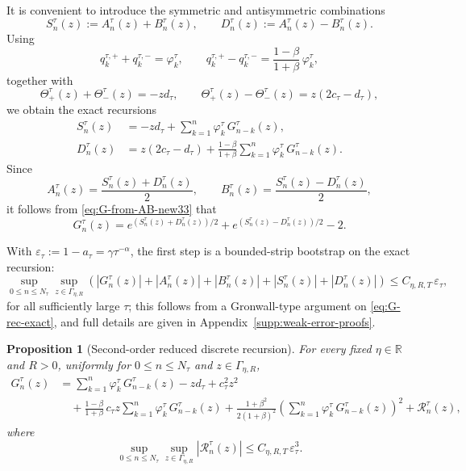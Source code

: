 \documentclass[letterpaper]{article}
\numberwithin{equation}{section}
\newtheorem{proposition}[theorem]{Proposition}
\theoremstyle{definition}
\theoremstyle{remark}
\begin{document}
It is convenient to introduce the symmetric and antisymmetric combinations
\begin{equation}\label{eq:SD-def-new33}
  S_n^\tau(z):=A_n^\tau(z)+B_n^\tau(z),
  \qquad
  D_n^\tau(z):=A_n^\tau(z)-B_n^\tau(z).
\end{equation}
Using
\[
  q_k^{\tau,+}+q_k^{\tau,-}=\varphi_k^\tau,
  \qquad
  q_k^{\tau,+}-q_k^{\tau,-}=\frac{1-\beta}{1+\beta}\,\varphi_k^\tau,
\]
together with
\[
  \Theta_+^\tau(z)+\Theta_-^\tau(z)=-zd_\tau,
  \qquad
  \Theta_+^\tau(z)-\Theta_-^\tau(z)=z(2c_\tau-d_\tau),
\]
we obtain the exact recursions
\begin{align}
  S_n^\tau(z)
  &= -zd_\tau+\sum_{k=1}^n \varphi_k^\tau\,G_{n-k}^\tau(z),
  \label{eq:S-rec-new33}
  \\
  D_n^\tau(z)
  &= z(2c_\tau-d_\tau)
     +\frac{1-\beta}{1+\beta}\sum_{k=1}^n \varphi_k^\tau\,G_{n-k}^\tau(z).
  \label{eq:D-rec-new33}
\end{align}
Since
\[
  A_n^\tau(z)=\frac{S_n^\tau(z)+D_n^\tau(z)}{2},
  \qquad
  B_n^\tau(z)=\frac{S_n^\tau(z)-D_n^\tau(z)}{2},
\]
it follows from \eqref{eq:G-from-AB-new33} that
\begin{equation}\label{eq:G-SD-new33}
  G_n^\tau(z)
  =
  e^{(S_n^\tau(z)+D_n^\tau(z))/2}
  +
  e^{(S_n^\tau(z)-D_n^\tau(z))/2}
  -2.
\end{equation}

With $\varepsilon_\tau:=1-a_\tau=\gamma\tau^{-\alpha}$, the first step is a
bounded-strip bootstrap on the exact recursion:
\[
  \sup_{0\le n\le N_\tau}\sup_{z\in\Gamma_{\eta,R}}
  \left(
    |G_n^\tau(z)|+|A_n^\tau(z)|+|B_n^\tau(z)|+|S_n^\tau(z)|+|D_n^\tau(z)|
  \right)
  \le C_{\eta,R,T}\,\varepsilon_\tau,
\]
for all sufficiently large $\tau$; this follows from a Gronwall-type argument on
\eqref{eq:G-rec-exact}, and full details are given in Appendix~\ref{supp:weak-error-proofs}.

\begin{proposition}[Second-order reduced discrete recursion]
\label{prop:reduced-recursion-new33}
For every fixed $\eta\in\mathbb R$ and $R>0$, uniformly for $0\le n\le N_\tau$ and
$z\in\Gamma_{\eta,R}$,
\begin{equation}\label{eq:G-reduced-new33}
\begin{aligned}
  G_n^\tau(z)
  &=
    \sum_{k=1}^n \varphi_k^\tau\,G_{n-k}^\tau(z)
    -zd_\tau
    + c_\tau^2 z^2 \\
  &\quad
    + \frac{1-\beta}{1+\beta}\,c_\tau z
      \sum_{k=1}^n \varphi_k^\tau\,G_{n-k}^\tau(z)
    + \frac{1+\beta^2}{2(1+\beta)^2}
      \left(\sum_{k=1}^n \varphi_k^\tau\,G_{n-k}^\tau(z)\right)^2
    + \mathcal R_n^\tau(z),
\end{aligned}
\end{equation}
where
\begin{equation}\label{eq:R-reduced-new33}
  \sup_{0\le n\le N_\tau}\sup_{z\in\Gamma_{\eta,R}}
  |\mathcal R_n^\tau(z)|
  \le C_{\eta,R,T}\,\varepsilon_\tau^3.
\end{equation}
\end{proposition}
\end{document}
